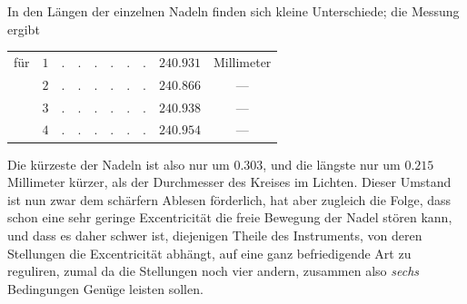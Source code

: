 In den Längen der einzelnen Nadeln finden sich kleine Unterschiede; die Messung ergibt
\begin{center}
\begin{tabular}{crcrc}
für &$1$&$.\quad.\quad.\quad.\quad.\quad.$&$240.931$&Millimeter\\
&$2$&$.\quad.\quad.\quad.\quad.\quad.$&$240.866$&—\\
&$3$&$.\quad.\quad.\quad.\quad.\quad.$&$240.938$&—\\
&$4$&$.\quad.\quad.\quad.\quad.\quad.$&$240.954$&—
\end{tabular}
\end{center}
Die kürzeste der Nadeln ist also nur um $0.303$, und die längste nur um $0.215$ Millimeter kürzer, als der Durchmesser des Kreises im Lichten. Dieser Umstand ist nun zwar dem schärfern Ablesen förderlich, hat aber zugleich die Folge, dass schon eine sehr geringe Excentricität die freie Bewegung der Nadel stören kann, und dass es daher schwer ist, diejenigen Theile des Instruments, von deren Stellungen die Excentricität abhängt, auf eine ganz befriedigende Art zu reguliren, zumal da die Stellungen noch vier andern, zusammen also \textit{sechs} Bedingungen Genüge leisten sollen.

